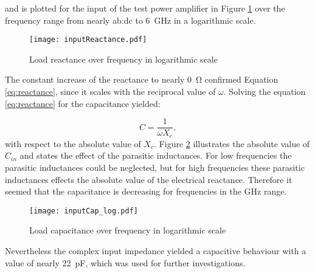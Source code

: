 and is plotted for the input of the test power amplifier in Figure \ref{fig:inputReactance} over the frequency range from nearly \gls{ab:dc} to \SI{6}{\giga \hertz} in a logarithmic scale.

\begin{figure}[H]
	\centering
  \texttt{[image: inputReactance.pdf]}
	\caption{Load reactance over frequency in logarithmic scale}
	\label{fig:inputReactance}
\end{figure}

The constant increase of the reactance to nearly \SI{0}{\ohm} confirmed Equation \ref{eq:reactance}, since it scales with the reciprocal value of $\omega$.
Solving the equation \ref{eq:reactance} for the capacitance yielded:

\begin{equation}
	C = \frac{1}{\omega X_c},
\end{equation}
with respect to the absolute value of $X_c$.
Figure \ref{fig:inputCap_log} illustrates the absolute value of $C_{in}$ and states the effect of the parasitic inductances.
For low frequencies the parasitic inductances could be neglected, but for high frequencies these parasitic inductances effects the absolute value of the electrical reactance.
Therefore it seemed that the capacitance is decreasing for frequencies in the \si{\giga \hertz} range.

\begin{figure}[H]
	\centering
  \texttt{[image: inputCap\_log.pdf]}
	\caption{Load capacitance over frequency in logarithmic scale}
	\label{fig:inputCap_log}
\end{figure}

Nevertheless the complex input impedance yielded a capacitive behaviour with a value of nearly \SI{22}{\pico \farad}, which was used for further investigations.

